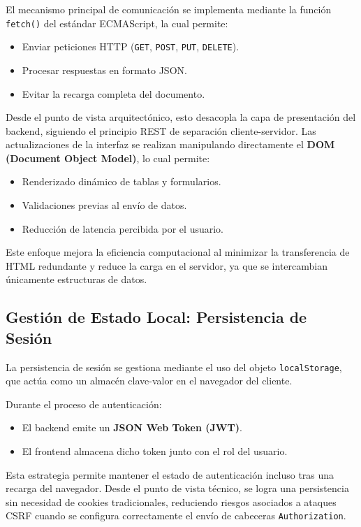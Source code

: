 \documentclass[12pt,letterpaper]{article}
\begin{document}
El mecanismo principal de comunicación se implementa mediante la función \texttt{fetch()} del estándar ECMAScript, la cual permite:
\begin{itemize}
    \item Enviar peticiones HTTP (\texttt{GET}, \texttt{POST}, \texttt{PUT}, \texttt{DELETE}).
    \item Procesar respuestas en formato JSON.
    \item Evitar la recarga completa del documento.
\end{itemize}

Desde el punto de vista arquitectónico, esto desacopla la capa de presentación del backend, siguiendo el principio REST de separación cliente-servidor. Las actualizaciones de la interfaz se realizan manipulando directamente el \textbf{DOM (Document Object Model)}, lo cual permite:
\begin{itemize}
    \item Renderizado dinámico de tablas y formularios.
    \item Validaciones previas al envío de datos.
    \item Reducción de latencia percibida por el usuario.
\end{itemize}

Este enfoque mejora la eficiencia computacional al minimizar la transferencia de HTML redundante y reduce la carga en el servidor, ya que se intercambian únicamente estructuras de datos.

\subsection{Gestión de Estado Local: Persistencia de Sesión}

La persistencia de sesión se gestiona mediante el uso del objeto \texttt{localStorage}, que actúa como un almacén clave-valor en el navegador del cliente.

Durante el proceso de autenticación:
\begin{itemize}
    \item El backend emite un \textbf{JSON Web Token (JWT)}.
    \item El frontend almacena dicho token junto con el rol del usuario.
\end{itemize}

Esta estrategia permite mantener el estado de autenticación incluso tras una recarga del navegador. Desde el punto de vista técnico, se logra una persistencia sin necesidad de cookies tradicionales, reduciendo riesgos asociados a ataques CSRF cuando se configura correctamente el envío de cabeceras \texttt{Authorization}.
\end{document}
